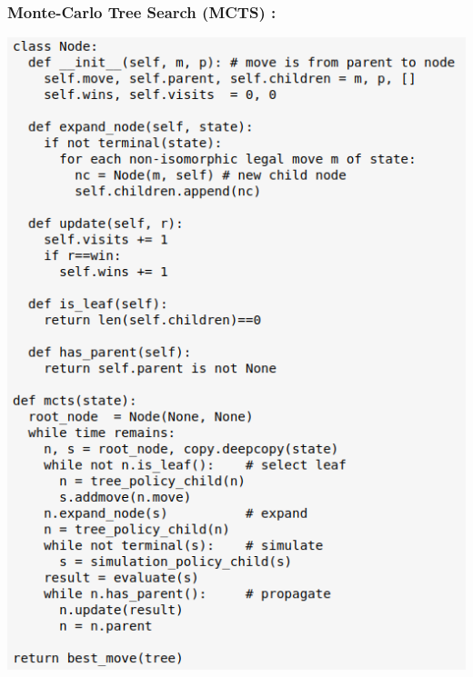 \documentclass{article}
\begin{document}
\subsubsection{Monte-Carlo Tree Search (MCTS) : }

\centerline{\includegraphics[scale = 0.5]{Monte_carlo_tree_search.png}}

\newpage
\end{document}
